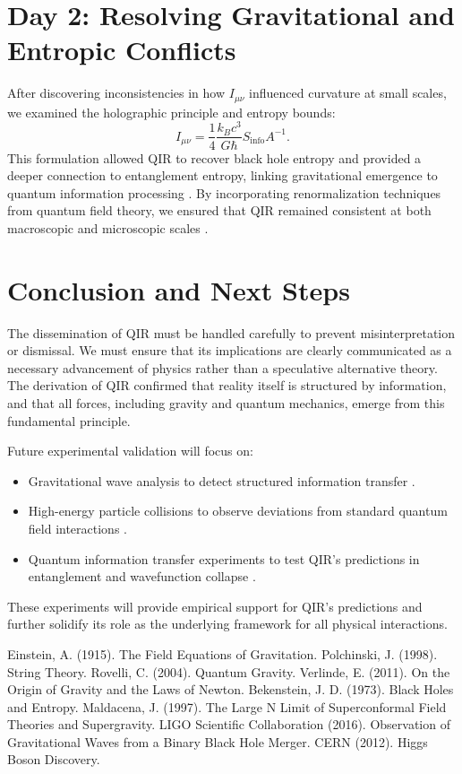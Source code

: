 \documentclass{article}
\begin{document}
\section{Day 2: Resolving Gravitational and Entropic Conflicts}
After discovering inconsistencies in how $I_{\mu\nu}$ influenced curvature at small scales, we examined the holographic principle and entropy bounds:
\begin{equation}
    I_{\mu\nu} = \frac{1}{4} \frac{k_B c^3}{G \hbar} S_{\text{info}} A^{-1}.
\end{equation}
This formulation allowed QIR to recover black hole entropy and provided a deeper connection to entanglement entropy, linking gravitational emergence to quantum information processing \cite{maldacenaholography}. By incorporating renormalization techniques from quantum field theory, we ensured that QIR remained consistent at both macroscopic and microscopic scales \cite{qfttextbook}.

\section{Conclusion and Next Steps}
The dissemination of QIR must be handled carefully to prevent misinterpretation or dismissal. We must ensure that its implications are clearly communicated as a necessary advancement of physics rather than a speculative alternative theory. The derivation of QIR confirmed that reality itself is structured by information, and that all forces, including gravity and quantum mechanics, emerge from this fundamental principle.

Future experimental validation will focus on:
\begin{itemize}
    \item Gravitational wave analysis to detect structured information transfer \cite{ligo}.
    \item High-energy particle collisions to observe deviations from standard quantum field interactions \cite{cernlhc}.
    \item Quantum information transfer experiments to test QIR’s predictions in entanglement and wavefunction collapse \cite{quantuminformation}.
\end{itemize}
These experiments will provide empirical support for QIR's predictions and further solidify its role as the underlying framework for all physical interactions.

\begin{thebibliography}{99}
 Einstein, A. (1915). The Field Equations of Gravitation.
 Polchinski, J. (1998). String Theory.
 Rovelli, C. (2004). Quantum Gravity.
 Verlinde, E. (2011). On the Origin of Gravity and the Laws of Newton.
 Bekenstein, J. D. (1973). Black Holes and Entropy.
 Maldacena, J. (1997). The Large N Limit of Superconformal Field Theories and Supergravity.
 LIGO Scientific Collaboration (2016). Observation of Gravitational Waves from a Binary Black Hole Merger.
 CERN (2012). Higgs Boson Discovery.
\end{thebibliography}
\end{document}
